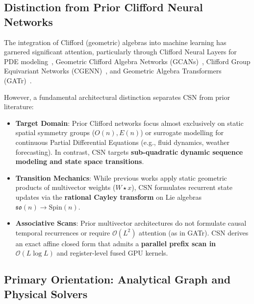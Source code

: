 \documentclass[11pt,a4paper]{article}
\begin{document}
\subsection{Distinction from Prior Clifford Neural Networks}

The integration of Clifford (geometric) algebras into machine learning has garnered significant attention, particularly through Clifford Neural Layers for PDE modeling~\cite{brandstetter2022clifford}, Geometric Clifford Algebra Networks (GCANs)~\cite{ruhe2023geometric}, Clifford Group Equivariant Networks (CGENN)~\cite{ruhe2023clifford}, and Geometric Algebra Transformers (GATr)~\cite{brehmer2023geometric}.

However, a fundamental architectural distinction separates CSN from prior literature:
\begin{itemize}[leftmargin=*]
    \item \textbf{Target Domain}: Prior Clifford networks focus almost exclusively on static spatial symmetry groups ($O(n), E(n)$) or surrogate modelling for continuous Partial Differential Equations (e.g., fluid dynamics, weather forecasting). In contrast, CSN targets \textbf{sub-quadratic dynamic sequence modeling and state space transitions}.
    \item \textbf{Transition Mechanics}: While previous works apply static geometric products of multivector weights ($W \star x$), CSN formulates recurrent state updates via the \textbf{rational Cayley transform} on Lie algebras $\mathfrak{so}(n) \to \mathrm{Spin}(n)$.
    \item \textbf{Associative Scans}: Prior multivector architectures do not formulate causal temporal recurrences or require $\mathcal{O}(L^2)$ attention (as in GATr). CSN derives an exact affine closed form that admits a \textbf{parallel prefix scan in $\mathcal{O}(L \log L)$} and register-level fused GPU kernels.
\end{itemize}

\subsection{Primary Orientation: Analytical Graph and Physical Solvers}
\end{document}
